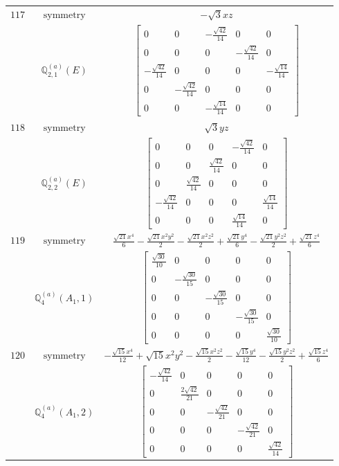 \documentclass[fleqn,8pt,landscape]{jsarticle}
\begin{document}
\begin{longtable}{ccc}
$ 117 $ & $ \text{symmetry} $ & $ - \sqrt{3} x z $ \\
$  $ & $ \mathbb{Q}_{2,1}^{(a)}(E) $ & $ \begin{bmatrix} 0 & 0 & - \frac{\sqrt{42}}{14} & 0 & 0 \\ 0 & 0 & 0 & - \frac{\sqrt{42}}{14} & 0 \\ - \frac{\sqrt{42}}{14} & 0 & 0 & 0 & - \frac{\sqrt{14}}{14} \\ 0 & - \frac{\sqrt{42}}{14} & 0 & 0 & 0 \\ 0 & 0 & - \frac{\sqrt{14}}{14} & 0 & 0 \end{bmatrix} $ \\ \hline
$ 118 $ & $ \text{symmetry} $ & $ \sqrt{3} y z $ \\
$  $ & $ \mathbb{Q}_{2,2}^{(a)}(E) $ & $ \begin{bmatrix} 0 & 0 & 0 & - \frac{\sqrt{42}}{14} & 0 \\ 0 & 0 & \frac{\sqrt{42}}{14} & 0 & 0 \\ 0 & \frac{\sqrt{42}}{14} & 0 & 0 & 0 \\ - \frac{\sqrt{42}}{14} & 0 & 0 & 0 & \frac{\sqrt{14}}{14} \\ 0 & 0 & 0 & \frac{\sqrt{14}}{14} & 0 \end{bmatrix} $ \\ \hline
$ 119 $ & $ \text{symmetry} $ & $ \frac{\sqrt{21} x^{4}}{6} - \frac{\sqrt{21} x^{2} y^{2}}{2} - \frac{\sqrt{21} x^{2} z^{2}}{2} + \frac{\sqrt{21} y^{4}}{6} - \frac{\sqrt{21} y^{2} z^{2}}{2} + \frac{\sqrt{21} z^{4}}{6} $ \\
$  $ & $ \mathbb{Q}_{4}^{(a)}(A_{1},1) $ & $ \begin{bmatrix} \frac{\sqrt{30}}{10} & 0 & 0 & 0 & 0 \\ 0 & - \frac{\sqrt{30}}{15} & 0 & 0 & 0 \\ 0 & 0 & - \frac{\sqrt{30}}{15} & 0 & 0 \\ 0 & 0 & 0 & - \frac{\sqrt{30}}{15} & 0 \\ 0 & 0 & 0 & 0 & \frac{\sqrt{30}}{10} \end{bmatrix} $ \\ \hline
$ 120 $ & $ \text{symmetry} $ & $ - \frac{\sqrt{15} x^{4}}{12} + \sqrt{15} x^{2} y^{2} - \frac{\sqrt{15} x^{2} z^{2}}{2} - \frac{\sqrt{15} y^{4}}{12} - \frac{\sqrt{15} y^{2} z^{2}}{2} + \frac{\sqrt{15} z^{4}}{6} $ \\
$  $ & $ \mathbb{Q}_{4}^{(a)}(A_{1},2) $ & $ \begin{bmatrix} - \frac{\sqrt{42}}{14} & 0 & 0 & 0 & 0 \\ 0 & \frac{2 \sqrt{42}}{21} & 0 & 0 & 0 \\ 0 & 0 & - \frac{\sqrt{42}}{21} & 0 & 0 \\ 0 & 0 & 0 & - \frac{\sqrt{42}}{21} & 0 \\ 0 & 0 & 0 & 0 & \frac{\sqrt{42}}{14} \end{bmatrix} $ \\ \hline

\end{longtable}
\end{document}

